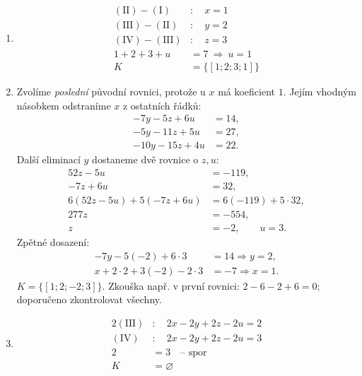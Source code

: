 \documentclass[11pt,a4paper]{article}
\begin{document}
\begin{zadaniReseniBox}[title={Domácí úkol}]
\begin{enumerate}[label=\alph*)]
\item
\[\begin{aligned}
(\mathrm{II})-(\mathrm I)&:\quad x=1\\(\mathrm{III})-(\mathrm{II})&:\quad y=2\\(\mathrm{IV})-(\mathrm{III})&:\quad z=3\\1+2+3+u&=7\ \Rightarrow\ u=1\\K&=\{[1;2;3;1]\}
\end{aligned}\]

\item
Zvolíme \emph{poslední} původní rovnici, protože u $x$ má koeficient $1$. Jejím vhodným násobkem odstraníme $x$ z ostatních řádků:
\[\begin{aligned}
-7y-5z+6u&=14,\\
-5y-11z+5u&=27,\\
-10y-15z+4u&=22.
\end{aligned}\]
Další eliminací $y$ dostaneme dvě rovnice o $z,u$:
\[\begin{aligned}
52z-5u&=-119,\\
-7z+6u&=32,\\
6(52z-5u)+5(-7z+6u)&=6(-119)+5\cdot32,\\
277z&=-554,\\
z&=-2,\qquad u=3.
\end{aligned}\]
Zpětné dosazení:
\[\begin{aligned}
-7y-5(-2)+6\cdot3&=14\Rightarrow y=2,\\
x+2\cdot2+3(-2)-2\cdot3&=-7\Rightarrow x=1.
\end{aligned}\]
$K=\{[1;2;-2;3]\}$. Zkouška např. v první rovnici: $2-6-2+6=0$; doporučeno zkontrolovat všechny.

\item
\[\begin{aligned}
2(\mathrm{III})&:\quad 2x-2y+2z-2u=2\\(\mathrm{IV})&:\quad 2x-2y+2z-2u=3\\2&=3\quad\text{-- spor}\\K&=\varnothing
\end{aligned}\]
\end{enumerate}
\end{zadaniReseniBox}


\end{document}
